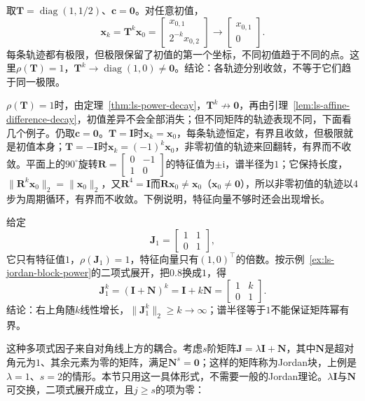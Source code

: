 \begin{example}[反例：各轨迹收敛但极限不同]
\label{ex:ls-separate-limits}
取$\bm T=\operatorname{diag}(1,1/2)$、$\bm c=\bm0$。对任意初值，
\[
 \bm x_k=\bm T^k\bm x_0=\begin{bmatrix}x_{0,1}\\2^{-k}x_{0,2}\end{bmatrix}\to\begin{bmatrix}x_{0,1}\\0\end{bmatrix}.
\]
每条轨迹都有极限，但极限保留了初值的第一个坐标，不同初值趋于不同的点。这里$\rho(\bm T)=1$，$\bm T^k\to\operatorname{diag}(1,0)\neq\bm0$。结论：各轨迹分别收敛，不等于它们趋于同一极限。
\end{example}

$\rho(\bm T)=1$时，由定理~\ref{thm:ls-power-decay}，$\bm T^k\not\to\bm0$，再由引理~\ref{lem:ls-affine-difference-decay}，初值差异不会全部消失；但不同矩阵的轨迹表现不同，下面看几个例子。仍取$\bm c=\bm0$。$\bm T=\bm I$时$\bm x_k=\bm x_0$，每条轨迹恒定，有界且收敛，但极限就是初值本身；$\bm T=-\bm I$时$\bm x_k=(-1)^k\bm x_0$，非零初值的轨迹来回翻转，有界而不收敛。平面上的$90^\circ$旋转$\bm R=\left[\begin{smallmatrix}0&-1\\1&0\end{smallmatrix}\right]$的特征值为$\pm\mathrm i$，谱半径为$1$；它保持长度，$\lVert\bm R^k\bm x_0\rVert_2=\lVert\bm x_0\rVert_2$，又$\bm R^4=\bm I$而$\bm R\bm x_0\neq\bm x_0$（$\bm x_0\neq\bm0$），所以非零初值的轨迹以$4$步为周期循环，有界而不收敛。下例说明，特征向量不够时还会出现增长。
\begin{example}
\label{ex:ls-unit-spectral-radius-growth}
给定
\[
 \bm J_1=\begin{bmatrix}1&1\\0&1\end{bmatrix},
\]
它只有特征值$1$，$\rho(\bm J_1)=1$，特征向量只有$(1,0)^\top$的倍数。按示例~\ref{ex:ls-jordan-block-power}的二项式展开，把$0.8$换成$1$，得
\[
 \bm J_1^k=(\bm I+\bm N)^k=\bm I+k\bm N=\begin{bmatrix}1&k\\0&1\end{bmatrix}.
\]
结论：右上角随$k$线性增长，$\lVert\bm J_1^k\rVert_2\geq k\to\infty$；谱半径等于$1$不能保证矩阵幂有界。
\end{example}
这种多项式因子来自对角线上方的耦合。考虑$s$阶矩阵$\bm J=\lambda\bm I+\bm N$，其中$\bm N$是超对角元为$1$、其余元素为零的矩阵，满足$\bm N^s=\bm0$；这样的矩阵称为Jordan块，上例是$\lambda=1$、$s=2$的情形。本节只用这一具体形式，不需要一般的Jordan理论。$\lambda\bm I$与$\bm N$可交换，二项式展开成立，且$j\geq s$的项为零：
